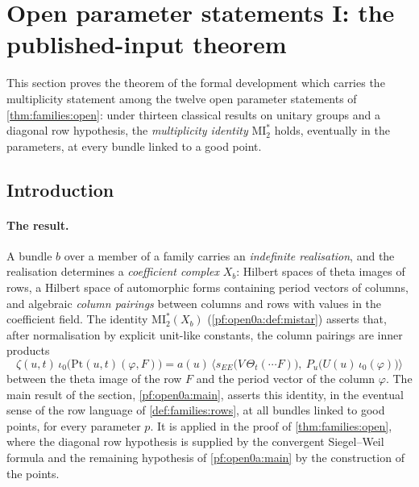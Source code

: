 \section{Open parameter statements I: the published-input theorem}\label{sec:pf:open0a}

\providecommand{\openzeroaMI}{\mathrm{MI}^{*}_{2}}
\providecommand{\openzeroaHS}[1]{\|#1\|_{\mathrm{HS}}}
\providecommand{\openzeroahs}{\operatorname{dev}}
\providecommand{\openzeroamfL}{\operatorname{mfL}}
\providecommand{\openzeroakfk}{\operatorname{kfk}}
\providecommand{\openzeroaeD}{e_{\mathrm{D}}}
\providecommand{\openzeroacj}{\operatorname{cj}}
\providecommand{\openzeroaLk}{\mathrm{Lk}}
\providecommand{\openzeroaEv}{\mathrm{Ev}}
\providecommand{\openzeroaTrue}{E^{\mathrm{true}}}
\providecommand{\openzeroaram}{M^{\mathrm{ram}}}
\providecommand{\openzeroaRow}{\mathcal{R}_0}
\providecommand{\openzeroaNV}{\mathrm{NV}}
\providecommand{\openzeroaSC}{\mathrm{SC}}

This section proves the theorem of the formal development \cite{LeanSource2026} which carries the multiplicity
statement among the twelve open parameter statements of \cref{thm:families:open}: under thirteen classical
results on unitary groups and a diagonal row hypothesis, the \emph{multiplicity identity} $\openzeroaMI$ holds,
eventually in the parameters, at every bundle linked to a good point.

\subsection{Introduction}\label{sec:pf:open0a:intro}

\paragraph{The result.}
A bundle $b$ over a member of a family carries an \emph{indefinite realisation}, and the realisation determines a
\emph{coefficient complex} $X_b$: Hilbert spaces of theta images of rows, a Hilbert space of automorphic forms
containing period vectors of columns, and algebraic \emph{column pairings} between columns and rows with values in
the coefficient field. The identity $\openzeroaMI(X_b)$ (\cref{pf:open0a:def:mistar}) asserts that, after
normalisation by explicit unit-like constants, the column pairings are inner products
\[
\zeta(u,t)\,\iota_0\bigl(\mathrm{Pt}(u,t)(\varphi,F)\bigr)
=a(u)\,\bigl\langle s_{EE}\bigl(V\,\Theta_t(\cdots F)\bigr),\ P_u\bigl(U(u)\,\iota_0(\varphi)\bigr)\bigr\rangle
\]
between the theta image of the row $F$ and the period vector of the column $\varphi$. The main result of the
section, \cref{pf:open0a:main}, asserts this identity, in the eventual sense of the row language of
\cref{def:families:rows}, at all bundles linked to good points, for every parameter $p$. It is applied in the proof
of \cref{thm:families:open}, where the diagonal row hypothesis is supplied by the convergent Siegel--Weil formula and
the remaining hypothesis of \cref{pf:open0a:main} by the construction of the points.

